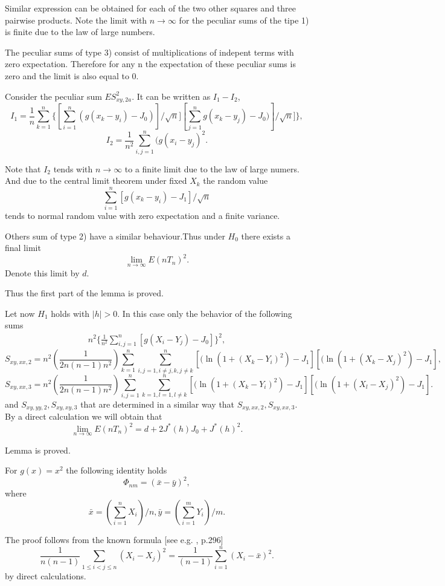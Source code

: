 \documentclass{svproc}
\begin{document}
Similar expression can be obtained for each of the two other squares and three  pairwise
products.
Note the limit with $n \to \infty$ for the peculiar sums of the tipe 1) is finite due to the law of large numbers.

The peculiar sums of type 3) consist of multiplications of indepent terms with zero expectation. Therefore for any n the expectation of these peculiar sums is zero and the limit is also equal to 0.

Consider the peculiar sum $ES^2_{xy,2a}.$  It can be written as $I_1 - I_2$,
$$
I_1=\frac{1}{n}\sum_{k=1}^n \{[\sum_{i=1}^n
(g(x_k-y_i)-J_0)]/\sqrt{n}][\sum_{j=1}^n
g(x_k-y_j)-J_0)]/\sqrt{n}]\},
$$
$$
I_2= \frac {1}{n^2}\sum_{i,j=1}^n(g(x_i-y_j)^2.
$$

Note that $I_2$ tends with $n \to \infty$ to a finite limit due to the law of large numers. And
due to the central limit theorem
under fixed  $X_k$ the random value
$$
\sum_{i=1}^n
[g(x_k-y_i)-J_1]/\sqrt{n}
$$
tends to normal random value with zero expectation and a finite variance.

Others sum of type 2) have a similar behaviour.Thus under $H_0$  there exists a final limit
$$
\lim_{n \to \infty}E(nT_n)^2.
$$
Denote this limit by $d$.

Thus the first part of the lemma is proved.

Let now $H_1$ holds with
$|h|>0$. In this case only the behavior of the following sums
\begin{eqnarray*}
n^2 \{\frac{1}{n^2}\sum_{i,j=1}^n [g(X_i - Y_j)-J_0]\}^2,
\end{eqnarray*}
$$
S_{xy,xx,2}=n^2 (\frac{1}{2n(n-1)n^2})\sum_{k=1}^n \sum_{i,j=1, i\ne j,k, j\ne k}^n[(\ln(1 + (X_k - Y_i)^2)-J_1][(\ln(1 + (X_k - X_j)^2)-J_1],
$$
$$
S_{xy,xx,3}=n^2 (\frac{1}{2n(n-1)n^2})\sum_{i,j=1}^n\sum_{k=1,l=1,l \ne k}^n [(\ln(1 + (X_k - Y_i)^2)-J_1][(\ln(1 + (X_l - X_j)^2)-J_1].
$$
and $S_{xy,yy,2},S_{xy,xy,3}$ that are determined in a similar way that  $S_{xy,xx,2},S_{xy,xx,3}$.
By a direct calculation we will obtain that
$$
\lim_{n \to \infty}E(nT_n)^2=
d + 2J^*(h)J_0 + J^*(h)^2.
$$

Lemma is proved.

\begin{lemma} For $g(x)= x^2$ the following identity holds
$$
\Phi_{nm}= (\bar x - \bar y)^2,
$$
where
$$
\bar x = (\sum_{i=1}^n X_i)/n,
\bar y = (\sum_{i=1}^m Y_i)/m.
$$
\end{lemma}

The proof follows from the known formula [see e.g. \cite{Hoeffding}, p.296]
$$
\frac {1}{n(n-1)}\sum_{1\leq i<j\leq n
} (X_i-X_j)^2=\frac {1}{(n-1)} \sum_{i=1}^n (X_i - \bar x)^2.
$$
by  direct calculations.
\end{document}
